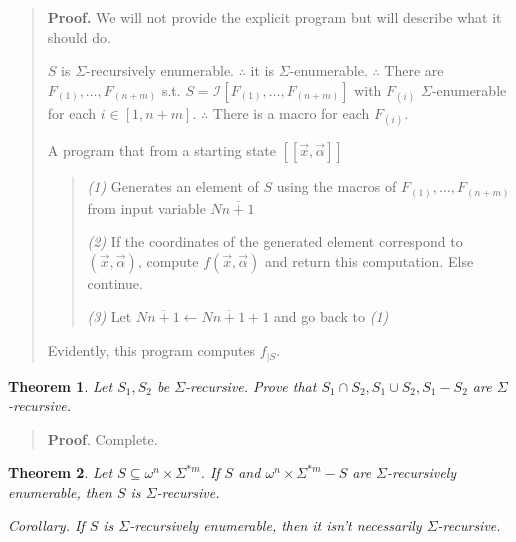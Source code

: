 \documentclass[a4paper, 12pt]{article}
\newtheorem{theorem}{Theorem}
\newtheorem{theorem}{Theorem}
\begin{document}
\small
\begin{quote}

\textbf{Proof.} We will not provide the explicit program but will describe what
it should do. 

$S$ is $\Sigma$-recursively enumerable. $\therefore $ it is $\Sigma$-enumerable.
$\therefore $ There are $F_{(1)}, \ldots,  F_{(n + m)}$ s.t. $S = \mathcal{I}
\left[ F_{(1)}, \ldots, F_{(n+m)} \right] $ with $F_{(i)}$ $\Sigma$-enumerable
for each $i \in [1, n + m]$. $\therefore $ There is a macro for each $F_{(i)}$.

A program that from a starting state $[\![ \vec{x}, \vec{\alpha} ]\!]$ 

\begin{quote}
    \textit{(1)} Generates an element of $S$ using the macros of $F_{(1)},
    \ldots, F_{(n+m)}$ from input variable $N \overline{n+1}$  

    \textit{(2)} If the coordinates of the generated element correspond to
    $(\vec{x}, \vec{\alpha}) $, compute $f (\vec{x}, \vec{\alpha}) $ and return
    this computation. Else continue. 

    \textit{(3)} Let $N\overline{n+1} \leftarrow  N\overline{n+1} + 1$ and go
    back to \textit{(1)}
\end{quote}

Evidently, this program computes $f_{| S}$. 

\end{quote}
\normalsize

\begin{theorem}
    Let $S_1, S_2$ be $\Sigma$-recursive. Prove that $S_1 \cap S_2, S_1 \cup
    S_2, S_1 - S_2$ are $\Sigma$-recursive.
\end{theorem}


\small
\begin{quote}

\textbf{Proof}. Complete.

\end{quote}
\normalsize

\begin{theorem}
    Let $S \subseteq \omega^{n} \times \Sigma^{*m} $. If $S$ and $\omega^{n}
    \times \Sigma^{*m} - S$ are $\Sigma$-recursively enumerable, then $S$ is
    $\Sigma$-recursive. 

    \textit{Corollary.} If $S$ is $\Sigma$-recursively enumerable, then it isn't
    necessarily $\Sigma$-recursive.
\end{theorem}
\end{document}
